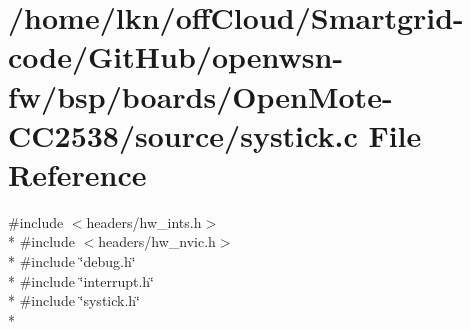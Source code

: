 \hypertarget{_open_mote-_c_c2538_2source_2_systick_8c}{}\section{/home/lkn/off\+Cloud/\+Smartgrid-\/code/\+Git\+Hub/openwsn-\/fw/bsp/boards/\+Open\+Mote-\/\+C\+C2538/source/systick.c File Reference}
\label{_open_mote-_c_c2538_2source_2_systick_8c}
{\ttfamily \#include $<$headers/hw\+\_\+ints.\+h$>$}\\*
{\ttfamily \#include $<$headers/hw\+\_\+nvic.\+h$>$}\\*
{\ttfamily \#include \char`\"{}debug.\+h\char`\"{}}\\*
{\ttfamily \#include \char`\"{}interrupt.\+h\char`\"{}}\\*
{\ttfamily \#include \char`\"{}systick.\+h\char`\"{}}\\*

